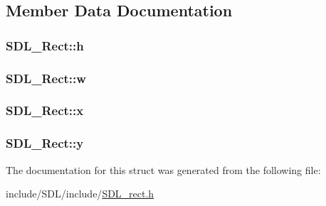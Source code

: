 \subsection{Member Data Documentation}
\hypertarget{struct_s_d_l___rect_a0a17d46b320af8063b746153348edd72}{
\subsubsection[{h}]{ S\-D\-L\-\_\-\-Rect\-::h}}\label{struct_s_d_l___rect_a0a17d46b320af8063b746153348edd72}
\hypertarget{struct_s_d_l___rect_a56b7be5738fb6fab86881534a814c45e}{
\subsubsection[{w}]{ S\-D\-L\-\_\-\-Rect\-::w}}\label{struct_s_d_l___rect_a56b7be5738fb6fab86881534a814c45e}
\hypertarget{struct_s_d_l___rect_a85418d94621dd6855805c4b5c7bf6482}{
\subsubsection[{x}]{ S\-D\-L\-\_\-\-Rect\-::x}}\label{struct_s_d_l___rect_a85418d94621dd6855805c4b5c7bf6482}
\hypertarget{struct_s_d_l___rect_a822694af8ddca5fd0d5d94e47106ab85}{
\subsubsection[{y}]{ S\-D\-L\-\_\-\-Rect\-::y}}\label{struct_s_d_l___rect_a822694af8ddca5fd0d5d94e47106ab85}


The documentation for this struct was generated from the following file\-:\begin{DoxyCompactItemize}
\item 
include/\-S\-D\-L/include/\hyperlink{_s_d_l__rect_8h}{S\-D\-L\-\_\-rect.\-h}\end{DoxyCompactItemize}
